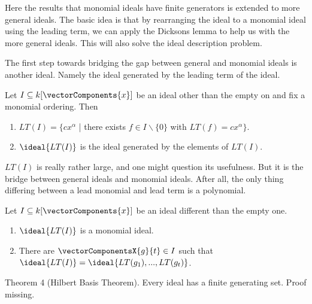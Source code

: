 Here the results that monomial ideals have finite generators is extended to more general ideals. The basic idea is that by rearranging the ideal to a monomial ideal using the leading term, we can apply the Dicksons lemma to help us with the more general ideals. This will also solve the ideal description problem. 

The first step towards bridging the gap between general and monomial ideals is another ideal. Namely the ideal generated by the leading term of the ideal. 

\begin{definition}
    Let $I \subseteq k[\vectorComponents{x}]$ be an ideal other than the empty on and fix a monomial ordering. Then 
    \begin{enumerate}
        \item $LT(I) = \{cx^\alpha$ | there exists $f \in I \backslash \{0\}$ with $LT(f) = cx^\alpha\}$.
        \item $\ideal{LT(I)}$ is the ideal generated by the elements of $LT(I)$.
    \end{enumerate}
\end{definition}

$LT(I)$ is really rather large, and one might question its usefulness. But it is the bridge between general ideals and monomial ideals. After all, the only thing differing between a lead monomial and lead term is a polynomial. 

\begin{proposition}
    Let $I \subseteq k[\vectorComponents{x}]$ be an ideal different than the empty one.
     \begin{enumerate}
        \item $\ideal{LT(I)}$ is a monomial ideal.
        \item There are $\vectorComponentsX{g}{t} \in I$ such that $\ideal{LT(I)} = \ideal{LT(g_1), ... , LT(g_t)}$.
     \end{enumerate}
\end{proposition}


Theorem 4 (Hilbert Basis Theorem). Every ideal has a finite generating set. Proof missing.